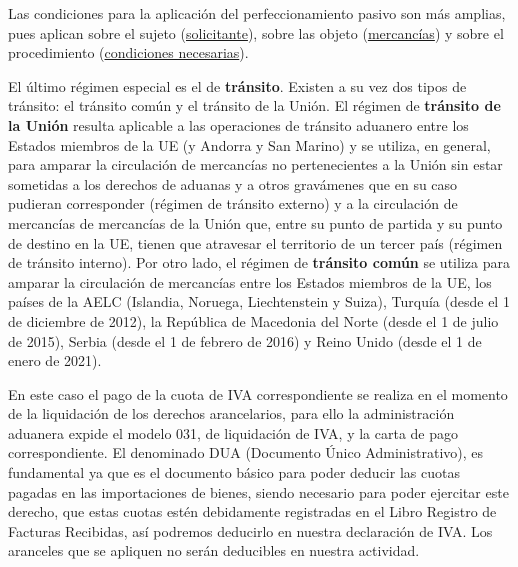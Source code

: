 \documentclass[10pt,a4paper]{article}
\begin{document}
{Las condiciones para la aplicación del perfeccionamiento pasivo son más amplias, pues aplican sobre el sujeto (\href{https://sede.agenciatributaria.gob.es/Sede/aduanas/regimenes-especiales/perfeccionamiento-activo-perfeccionamiento-pasivo/requisitos-que-debe-reunir-solicitante-pasivo.html}{solicitante}), sobre las objeto (\href{https://sede.agenciatributaria.gob.es/Sede/aduanas/regimenes-especiales/perfeccionamiento-activo-perfeccionamiento-pasivo/mercancias-excluidas-regimen-perfeccionamiento-pasivo.html}{mercancías}) y sobre el procedimiento (\href{https://sede.agenciatributaria.gob.es/Sede/aduanas/regimenes-especiales/perfeccionamiento-activo-perfeccionamiento-pasivo/condiciones-necesarias-consecucion-autorizacion-perf-pas.html}{condiciones necesarias}).
}

El último régimen especial es el de \textbf{tránsito}. Existen a su vez dos tipos de tránsito: el tránsito común y el tránsito de la Unión. El régimen de \textbf{tránsito de la Unión} resulta aplicable a las operaciones de tránsito aduanero entre los Estados miembros de la UE (y Andorra y San Marino) y se utiliza, en general, para amparar la circulación de mercancías no pertenecientes a la Unión sin estar sometidas a los derechos de aduanas y a otros gravámenes que en su caso pudieran corresponder (régimen de tránsito externo) y a la circulación de mercancías de mercancías de la Unión que, entre su punto de partida y su punto de destino en la UE, tienen que atravesar el territorio de un tercer país (régimen de tránsito interno). Por otro lado, el régimen de \textbf{tránsito común} se utiliza para amparar la circulación de mercancías entre los Estados miembros de la UE, los países de la AELC (Islandia, Noruega, Liechtenstein y Suiza), Turquía (desde el 1 de diciembre de 2012), la República de Macedonia del Norte (desde el 1 de julio de 2015), Serbia (desde el 1 de febrero de 2016) y Reino Unido (desde el 1 de enero de 2021).

En este caso el pago de la cuota de IVA correspondiente se realiza en el momento de la liquidación de los derechos arancelarios, para ello la administración aduanera expide el modelo 031, de liquidación de IVA, y la carta de pago correspondiente. El denominado DUA (Documento Único Administrativo), es fundamental ya que es el documento básico para poder deducir las cuotas pagadas en las importaciones de bienes, siendo necesario para poder ejercitar este derecho, que estas cuotas estén debidamente registradas en el Libro Registro de Facturas Recibidas, así podremos deducirlo en nuestra declaración de IVA. Los aranceles que se apliquen no serán deducibles en nuestra actividad.
\end{document}
